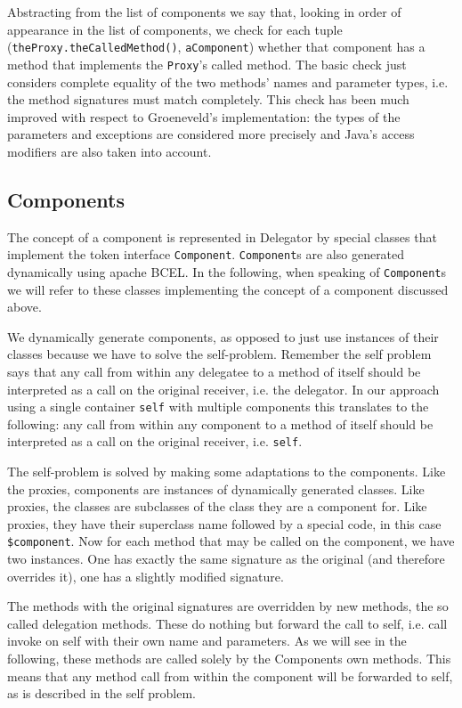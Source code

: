 \documentclass[a4paper,12pt]{book}
\begin{document}
Abstracting from the list of components we say that, looking in order of appearance in the list of components, we check for each tuple (\verb|theProxy.theCalledMethod()|, \verb|aComponent|)  whether that component has a method that implements the \verb|Proxy|'s called method. The basic check just considers complete equality of the two methods' names and parameter types, i.e. the method signatures must match completely. This check has been much improved with respect to Groeneveld's implementation: the types of the parameters and exceptions are considered more precisely and Java's access modifiers are also taken into account. 

\subsection*{Components}
The concept of a component is represented in Delegator by special classes that implement the token interface \verb|Component|. \verb|Component|s are also generated dynamically using apache BCEL. In the following, when speaking of \verb|Component|s we will refer to these classes implementing the concept of a component discussed above.

We dynamically generate components, as opposed to just use instances of their classes because we have to solve the self-problem. Remember the self problem says that any call from within any delegatee to a method of itself should be interpreted as a call on the original receiver, i.e. the delegator. In our approach using a single container \verb|self| with multiple components this translates to the following: any call from within any component to a method of itself should be interpreted as a call on the original receiver, i.e. \verb|self|.

The self-problem is solved by making some adaptations to the components. Like the proxies, components are instances of dynamically generated classes. Like proxies, the classes are subclasses of the class they are a component for. Like proxies, they have their superclass name followed by a special code, in this case \verb|$component|. Now for each method that may be called on the component, we have two instances. One has exactly the same signature as the original (and therefore overrides it), one has a slightly modified signature.

The methods with the original signatures are overridden by new methods, the so called delegation methods. These do nothing but forward the call to self, i.e. call invoke on self with their own name and parameters. As we will see in the following, these methods are called solely by the Components own methods. This means that any method call from within the component will be forwarded to self, as is described in the self problem.
\end{document}
